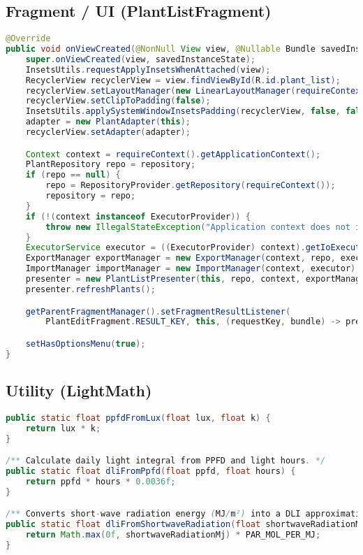\documentclass[14pt,a4paper]{report}
\begin{document}
\subsection*{Fragment / UI (PlantListFragment)}
\begin{lstlisting}[language=Java, caption={Fragment PlantListFragment.java (Auszug)}]
@Override
public void onViewCreated(@NonNull View view, @Nullable Bundle savedInstanceState) {
    super.onViewCreated(view, savedInstanceState);
    InsetsUtils.requestApplyInsetsWhenAttached(view);
    RecyclerView recyclerView = view.findViewById(R.id.plant_list);
    recyclerView.setLayoutManager(new LinearLayoutManager(requireContext()));
    recyclerView.setClipToPadding(false);
    InsetsUtils.applySystemWindowInsetsPadding(recyclerView, false, false, false, true);
    adapter = new PlantAdapter(this);
    recyclerView.setAdapter(adapter);

    Context context = requireContext().getApplicationContext();
    PlantRepository repo = repository;
    if (repo == null) {
        repo = RepositoryProvider.getRepository(requireContext());
        repository = repo;
    }
    if (!(context instanceof ExecutorProvider)) {
        throw new IllegalStateException("Application context does not implement ExecutorProvider");
    }
    ExecutorService executor = ((ExecutorProvider) context).getIoExecutor();
    ExportManager exportManager = new ExportManager(context, repo, executor);
    ImportManager importManager = new ImportManager(context, executor);
    presenter = new PlantListPresenter(this, repo, context, exportManager, importManager);
    presenter.refreshPlants();

    getParentFragmentManager().setFragmentResultListener(
        PlantEditFragment.RESULT_KEY, this, (requestKey, bundle) -> presenter.refreshPlants());

    setHasOptionsMenu(true);
}
\end{lstlisting}

\subsection*{Utility (LightMath)}
\begin{lstlisting}[language=Java, caption={Utility LightMath.java (Auszug)}]
public static float ppfdFromLux(float lux, float k) {
    return lux * k;
}

/** Calculate daily light integral from PPFD and light hours. */
public static float dliFromPpfd(float ppfd, float hours) {
    return ppfd * hours * 0.0036f;
}

/** Converts short-wave radiation energy (MJ/m²) into a DLI approximation. */
public static float dliFromShortwaveRadiation(float shortwaveRadiationMj) {
    return Math.max(0f, shortwaveRadiationMj) * PAR_MOL_PER_MJ;
}
\end{lstlisting}
\end{document}
